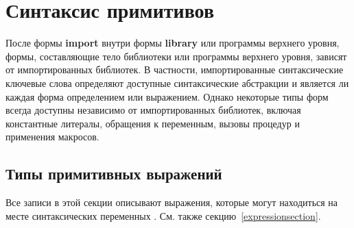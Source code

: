 \chapter{Синтаксис примитивов}\vspace{2mm}

После формы {\bfseries\cf import} внутри формы {\bfseries\cf library} или программы верхнего уровня,
формы, составляющие тело библиотеки или программы верхнего уровня, зависят от
импортированных библиотек.
В частности, импортированные синтаксические ключевые слова определяют
доступные синтаксические абстракции и является ли каждая форма определением или
выражением. Однако некоторые типы форм всегда доступны независимо от импортированных библиотек,
включая константные литералы, обращения к переменным, вызовы
процедур и применения макросов.

\section{Типы примитивных выражений}
\label{primitiveexpressionsection}

Все записи в этой секции описывают выражения, которые могут находиться на месте синтаксических
переменных . См. также секцию~\ref{expressionsection}.

